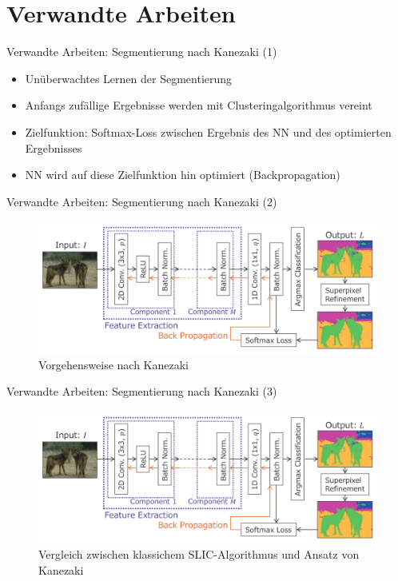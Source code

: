 \documentclass[9pt]{beamer}
\begin{document}
\section{Verwandte Arbeiten}

\begin{frame}{Verwandte Arbeiten: Segmentierung nach Kanezaki\cite{kanezaki2018_unsupervised_segmentation} (1)}
\begin{itemize}
	\item Unüberwachtes Lernen der Segmentierung
	\item Anfangs zufällige Ergebnisse werden mit Clusteringalgorithmus vereint
	\item Zielfunktion: Softmax-Loss zwischen Ergebnis des NN und des optimierten Ergebnisses
	\item NN wird auf diese Zielfunktion hin optimiert (Backpropagation)
\end{itemize}
\end{frame}

\begin{frame}{Verwandte Arbeiten: Segmentierung nach Kanezaki\cite{kanezaki2018_unsupervised_segmentation} (2)}
\begin{figure}
	\includegraphics[width=\textwidth,keepaspectratio]{kanezaki.png}
	\caption{Vorgehensweise nach Kanezaki\cite{kanezaki2018_unsupervised_segmentation}}
\end{figure}
\end{frame}

\begin{frame}{Verwandte Arbeiten: Segmentierung nach Kanezaki\cite{kanezaki2018_unsupervised_segmentation} (3)}
\begin{figure}
	\includegraphics[width=\textwidth,keepaspectratio]{kanezaki.png}
	\caption{Vergleich zwischen klassichem SLIC-Algorithmus und Ansatz von Kanezaki}
\end{figure}
\end{frame}
\end{document}
